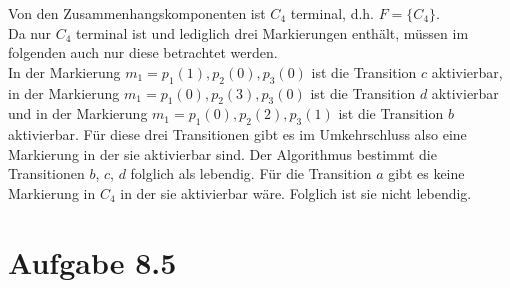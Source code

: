 \documentclass[12pt, paper=a4]{article}
\begin{document}
Von den Zusammenhangskomponenten ist \(C_4\) terminal, d.h. \(F=\{C_4\}\).\\
Da nur $C_{4}$ terminal ist und lediglich drei Markierungen enthält, müssen im folgenden auch nur diese betrachtet werden.\\
In der Markierung $m_{1}=p_{1}(1),p_{2}(0),p_{3}(0)$ ist die Transition $c$ aktivierbar,
in der Markierung $m_{1}=p_{1}(0),p_{2}(3),p_{3}(0)$ ist die Transition $d$ aktivierbar und in der Markierung $m_{1}=p_{1}(0),p_{2}(2),p_{3}(1)$ ist die Transition $b$ aktivierbar. Für diese drei Transitionen gibt es im Umkehrschluss also eine Markierung in der sie aktivierbar sind. Der Algorithmus bestimmt die Transitionen $b$, $c$, $d$ folglich als lebendig. Für die Transition $a$ gibt es keine Markierung in $C_{4}$ in der sie aktivierbar wäre. Folglich ist sie nicht lebendig.


\section*{Aufgabe 8.5}
\end{document}
